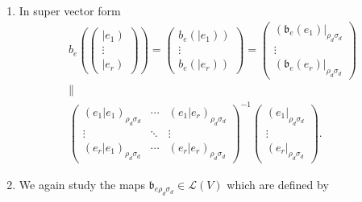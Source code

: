 \documentclass[aps,preprint]{revtex4}
\begin{document}
\begin{enumerate}
\item In super vector form 
\begin{gather}
b_{e}\left( \left( 
\begin{array}{c}
\left\vert e_{1}\right) \\ 
\vdots \\ 
\left\vert e_{r}\right)%
\end{array}%
\right) \right) =\left( 
\begin{array}{c}
b_{e}\left( \left\vert e_{1}\right) \right) \\ 
\vdots \\ 
b_{e}\left( \left\vert e_{r}\right) \right)%
\end{array}%
\right) =\left( 
\begin{array}{c}
\left( \mathfrak{b}_{e}\left( e_{1}\right) \right\vert _{\rho _{d}\sigma
_{d}} \\ 
\vdots \\ 
\left( \mathfrak{b}_{e}\left( e_{r}\right) \right\vert _{\rho _{d}\sigma
_{d}}%
\end{array}%
\right) \\
\parallel \\
\left( 
\begin{array}{ccc}
\left( \left. e_{1}\right\vert e_{1}\right) _{\rho _{d}\sigma _{d}} & \cdots
& \left( \left. e_{1}\right\vert e_{r}\right) _{\rho _{d}\sigma _{d}} \\ 
\vdots & \ddots & \vdots \\ 
\left( \left. e_{r}\right\vert e_{1}\right) _{\rho _{d}\sigma _{d}} & \cdots
& \left( \left. e_{r}\right\vert e_{r}\right) _{\rho _{d}\sigma _{d}}%
\end{array}%
\right) ^{\boldsymbol{-}1}\left( 
\begin{array}{c}
\left( e_{1}\right\vert _{\rho _{d}\sigma _{d}} \\ 
\vdots \\ 
\left( e_{r}\right\vert _{\rho _{d}\sigma _{d}}%
\end{array}%
\right) .
\end{gather}

\item We again study the maps $\mathfrak{b}_{e\rho _{d}\sigma _{d}}\in 
\mathcal{L}\left( V\right) $ which are defined by


\end{enumerate}
\end{document}
